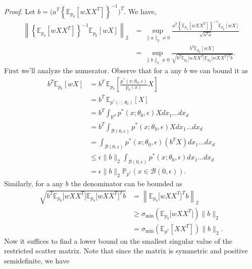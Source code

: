 \documentclass[11pt]{article}
\begin{document}
\noindent \textit{Proof}. Let $b= \Big(a^{T}\left\{\mathbb{E}_{p_{0}}[wXX^{T}]\right\}^{-1}\Big)^{T}$. We have,
\begin{align}
    \left\|\left\{\mathbb{E}_{p_0}[wXX^{T}]\right\}^{-1}\mathbb{E}_{p_0}[wX]\right\|_2 &= \sup_{\|a\|_2\neq 0} \frac{a^{T}\left\{\mathbb{E}_{p_0}[wXX^{T}]\right\}^{-1}\mathbb{E}_{p_0}[wX]}{\sqrt{a^{T}a}} \\
    &= \sup_{\|b\|_2 \neq 0} \frac{b^{T}\mathbb{E}_{p_0}[wX]}{\sqrt{b^{T} \mathbb{E}_{p_0}\big[wXX^{T}\big]\mathbb{E}_{p_0}\big[wXX^{T}\big]^{T}b}}. \label{eq: projection norm}
\end{align}
First we'll analyze the numerator. Observe that for a any $b$ we can bound it as
\begin{align}
    b^{T}\mathbb{E}_{p_{0}}[wX] &= b^{T}\,\mathbb{E}_{ p_{0}}\left[\frac{p^*(x;\theta_0, \epsilon)}{p_{0}(x)}X\right] \\
    &= b^{T}\,\mathbb{E}_{p^*(\cdot\,; \,\theta_0)}\left[X\right] \\
    &= b^{T}\int_{\mathbb{R}^d}p^*(x;\theta_0, \epsilon)X dx_1 \dots dx_d \\
    &= b^{T}\int_{\mathcal{B}(0, \epsilon)}p^*(x;\theta_0, \epsilon)X dx_1 \dots dx_d \\
    &= \int_{\mathcal{B}(0, \epsilon)}p^*(x;\theta_0, \epsilon)(b^{T}X) dx_1 \dots dx_d \\
    &\leq \epsilon \|b\|_2 \int_{\mathcal{B}(0, \epsilon)}p^*(x;\theta_0, \epsilon) dx_1 \dots dx_d \\
    &= \epsilon\|b\|_2\mathbb{P}_{p^*}(x \in \mathcal{B}(0, \epsilon)). \label{eq: numerator bound}
\end{align}
Similarly, for a any $b$ the denominator can be bounded as
\begin{align}
    \sqrt{b^{T} \mathbb{E}_{p_0}\big[wXX^{T}\big]\mathbb{E}_{p_0}\big[wXX^{T}\big]^{T}b} &= \left\| \mathbb{E}_{p_0}\big[wXX^{T}\big]^{T}b\right\|_2 \\
    &\geq \sigma_{\min}\left(\mathbb{E}_{ p_0}\big[wXX^{T}\big]\right) \|b\|_2 \\
    &= \sigma_{\min}\left(\mathbb{E}_{p^*}\left[XX^{T}\right]\right) \|b\|_2. \label{eq: denominator bound 1}
\end{align}
Now it suffices to find a lower bound on the smallest singular value of the restricted scatter matrix. Note that since the matrix is symmetric and positive semidefinite, we have 
\end{document}
